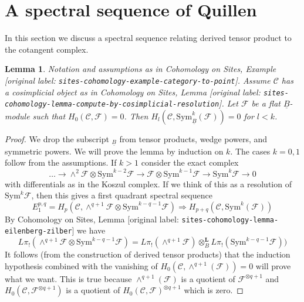 \documentclass[10pt,a4paper]{article}
\theoremstyle{plain}
\newtheorem{lemma}[subsection]{Lemma}
\theoremstyle{definition}
\theoremstyle{remark}
\numberwithin{equation}{subsection}
\begin{document}
\section{A spectral sequence of Quillen}
\label{section-spectral-sequence}

\noindent
In this section we discuss a spectral sequence relating derived
tensor product to the cotangent complex.

\begin{lemma}
\label{lemma-vanishing-symmetric-powers}
Notation and assumptions as in
Cohomology on Sites, Example \textnormal{[original label: \nolinkurl{sites-cohomology-example-category-to-point}]}.
Assume $\mathcal{C}$ has a cosimplicial object as in
Cohomology on Sites, Lemma
\textnormal{[original label: \nolinkurl{sites-cohomology-lemma-compute-by-cosimplicial-resolution}]}.
Let $\mathcal{F}$ be a flat $\underline{B}$-module such that
$H_0(\mathcal{C}, \mathcal{F}) = 0$.
Then $H_l(\mathcal{C}, \text{Sym}_{\underline{B}}^k(\mathcal{F})) = 0$
for $l < k$.
\end{lemma}

\begin{proof}
We drop the subscript ${}_{\underline{B}}$ from tensor products, wedge powers,
and symmetric powers. We will prove the lemma by induction on $k$.
The cases $k = 0, 1$ follow from the assumptions. If $k > 1$ consider
the exact complex
$$
\ldots \to
\wedge^2\mathcal{F} \otimes \text{Sym}^{k - 2}\mathcal{F} \to
\mathcal{F} \otimes \text{Sym}^{k - 1}\mathcal{F} \to
\text{Sym}^k\mathcal{F} \to 0
$$
with differentials as in the Koszul complex. If we think of this as a
resolution of $\text{Sym}^k\mathcal{F}$, then this gives a first quadrant
spectral sequence
$$
E_1^{p, q} =
H_p(\mathcal{C},
\wedge^{q + 1}\mathcal{F} \otimes \text{Sym}^{k - q - 1}\mathcal{F})
\Rightarrow
H_{p + q}(\mathcal{C}, \text{Sym}^k(\mathcal{F}))
$$
By Cohomology on Sites, Lemma \textnormal{[original label: \nolinkurl{sites-cohomology-lemma-eilenberg-zilber}]}
we have
$$
L\pi_!(\wedge^{q + 1}\mathcal{F} \otimes \text{Sym}^{k - q - 1}\mathcal{F}) =
L\pi_!(\wedge^{q + 1}\mathcal{F}) \otimes_B^\mathbf{L}
L\pi_!(\text{Sym}^{k - q - 1}\mathcal{F}))
$$
It follows (from the construction of derived tensor products) that
the induction hypothesis combined with the vanishing
of $H_0(\mathcal{C}, \wedge^{q + 1}(\mathcal{F})) = 0$ will prove what we want.
This is true because $\wedge^{q + 1}(\mathcal{F})$ is a quotient
of $\mathcal{F}^{\otimes q + 1}$ and
$H_0(\mathcal{C}, \mathcal{F}^{\otimes q + 1})$
is a quotient of $H_0(\mathcal{C}, \mathcal{F})^{\otimes q + 1}$
which is zero.
\end{proof}
\end{document}
